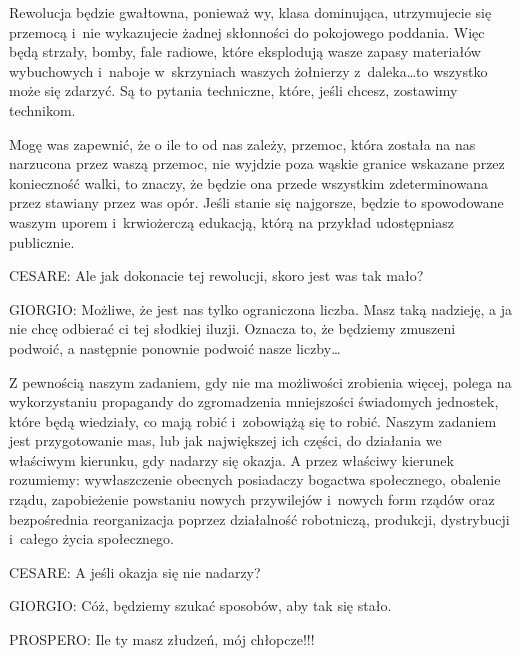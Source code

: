\documentclass[oneside,polish,11pt,sfheadings]{mwbk}
\begin{document}
 
Rewolucja będzie gwałtowna, ponieważ wy, klasa dominująca, utrzymujecie się przemocą i~nie wykazujecie żadnej skłonności
do pokojowego poddania. Więc będą strzały, bomby, fale radiowe, które eksplodują wasze zapasy materiałów wybuchowych i~naboje w~skrzyniach waszych żołnierzy z~daleka\ldots to wszystko może się zdarzyć. Są to pytania techniczne, które, jeśli
chcesz, zostawimy technikom. 

 
Mogę was zapewnić, że o ile to od nas zależy, przemoc, która została na nas narzucona przez waszą przemoc, nie wyjdzie
poza wąskie granice wskazane przez konieczność walki, to znaczy, że będzie ona przede wszystkim zdeterminowana przez
stawiany przez was opór. Jeśli stanie się najgorsze, będzie to spowodowane waszym uporem i~krwiożerczą edukacją, którą
na przykład udostępniasz publicznie. 




 
\noindent CESARE: Ale jak dokonacie tej rewolucji, skoro jest was tak mało? 




 
\noindent GIORGIO: Możliwe, że jest nas tylko ograniczona liczba. Masz taką nadzieję, a ja nie chcę odbierać ci tej słodkiej
iluzji. Oznacza to, że będziemy zmuszeni podwoić, a następnie ponownie podwoić nasze liczby\ldots 

 
Z pewnością naszym zadaniem, gdy nie ma możliwości zrobienia więcej, polega na wykorzystaniu propagandy do zgromadzenia
mniejszości świadomych jednostek, które będą wiedziały, co mają robić i~zobowiążą się to robić. Naszym zadaniem jest
przygotowanie mas, lub jak największej ich części, do działania we właściwym kierunku, gdy nadarzy się okazja. A przez
właściwy kierunek rozumiemy: wywłaszczenie obecnych posiadaczy bogactwa społecznego, obalenie rządu, zapobieżenie
powstaniu nowych przywilejów i~nowych form rządów oraz bezpośrednia reorganizacja poprzez działalność robotniczą,
produkcji, dystrybucji i~całego życia społecznego. 




 
\noindent CESARE: A jeśli okazja się nie nadarzy? 




 
\noindent GIORGIO: Cóż, będziemy szukać sposobów, aby tak się stało. 




 
\noindent PROSPERO: Ile ty masz złudzeń, mój chłopcze!!! 
\end{document}
